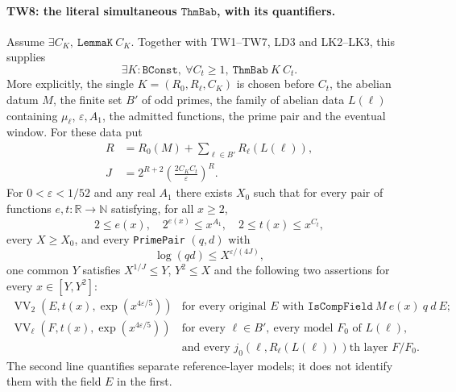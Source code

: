 \paragraph{TW8: the literal simultaneous \(\texttt{ThmBab}\), with its quantifiers.}
\label{claim:TW8}
Assume $\exists C_K,\ \texttt{LemmaK}\ C_K$.
Together with TW1--TW7, LD3 and LK2--LK3, this supplies
\[
                \exists K:\texttt{BConst},\
                \forall C_t\ge1,\ \texttt{ThmBab}\ K\ C_t .
 \tag{TW.36}
\]
More explicitly, the single $K=(R_0,R_\ell,C_K)$ is chosen
before $C_t$, the abelian datum $M$, the finite set $B'$ of
odd primes, the family of abelian data $L(\ell)$ containing
$\mu_\ell$, $\varepsilon,A_1$, the admitted functions, the
prime pair and the eventual window.  For these data put
\[
 \begin{split}
 R&=R_0(M)+\sum_{\ell\in B'}R_\ell(L(\ell)),\\
 J&=2^{R+2}\left(\frac{2C_KC_t}{\varepsilon}\right)^R.
 \end{split}                                           \tag{TW.37}
\]
For $0<\varepsilon<1/52$ and any real $A_1$ there exists $X_0$
such that for every pair of functions $e,t:\mathbb R\to\mathbb N$
satisfying, for all $x\ge2$,
\[
 2\le e(x),\quad 2^{e(x)}\le x^{A_1},\quad
                  2\le t(x)\le x^{C_t},                 \tag{TW.38}
\]
every $X\ge X_0$, and every \texttt{PrimePair} $(q,d)$ with
\[
                         \log(qd)\le X^{\varepsilon/(4J)},
 \tag{TW.39}
\]
one common $Y$ satisfies $X^{1/J}\le Y$, $Y^2\le X$ and the
following two assertions for every $x\in[Y,Y^2]$:
\[
 \begin{array}{ll}
 \operatorname{VV}_2(E,t(x),\exp(x^{4\varepsilon/5}))
 &\text{for every original }
 E\text{ with }\texttt{IsCompField}\ M\ e(x)\ q\ d\ E;\\[2mm]
 \operatorname{VV}_\ell(F,t(x),\exp(x^{4\varepsilon/5}))
 &\text{for every }\ell\in B',\ \text{every model }F_0
   \text{ of }L(\ell),\\
 &\text{and every }j_0(\ell,R_\ell(L(\ell)))\text{th layer }
 F/F_0 .
 \end{array}                                           \tag{TW.40}
\]
The second line quantifies separate reference-layer models;
it does not identify them with the field $E$ in the first.

